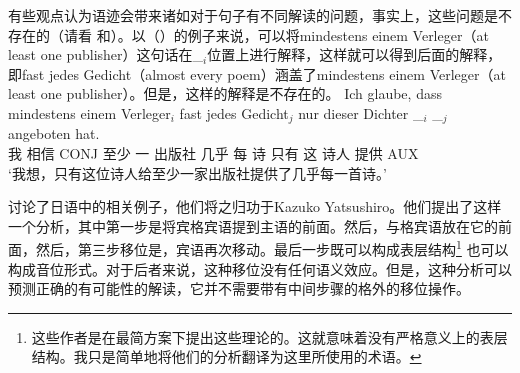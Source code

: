 \noindent
有些观点认为语迹会带来诸如对于句子有不同解读的问题，事实上，这些问题是不存在的（请看\citealp[]{Kiss2001a} 和\citealp[Section~2.6]{Fanselow2001a}）。以（）的例子来说，可以将mindestens einem Verleger（at least one publisher）这句话在\_$_i$位置上进行解释，这样就可以得到后面的解释，即fast jedes Gedicht（almost every poem）涵盖了mindestens einem Verleger（at least one publisher）。但是，这样的解释是不存在的。
\ea
\gll Ich glaube, dass mindestens einem Verleger$_i$ fast jedes Gedicht$_j$ nur dieser Dichter \_$_i$ \_$_j$ angeboten hat.\\
	 我 相信 CONJ 至少 一 出版社 几乎 每 诗 只有 这 诗人 {} {} 提供 AUX\\
\glt `我想，只有这位诗人给至少一家出版社提供了几乎每一首诗。'
\z

\citet[]{SE2002a} 讨论了日语中的相关例子，他们将之归功于Kazuko 
Yatsushiro。他们提出了这样一个分析，其中第一步是将宾格宾语提到主语的前面。然后，与格宾语放在它的前面，然后，第三步移位是，宾语再次移动。最后一步既可以构成表层结构\footnote{
   这些作者是在最简方案下提出这些理论的。这就意味着没有严格意义上的表层结构。我只是简单地将他们的分析翻译为这里所使用的术语。
}
也可以构成音位形式。对于后者来说，这种移位没有任何语义效应。但是，这种分析可以预测正确的有可能性的解读，它并不需要带有中间步骤的格外的移位操作。

